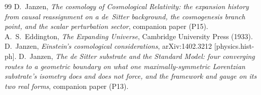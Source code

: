\documentclass[11pt,a4paper]{article}
\begin{document}
\begin{thebibliography}{99}
 D.~Janzen, \emph{The cosmology of Cosmological Relativity: the expansion history from causal reassignment on a de~Sitter background, the cosmogenesis branch point, and the scalar perturbation sector}, companion paper (P15).
 A.~S.~Eddington, \emph{The Expanding Universe}, Cambridge University Press (1933).
 D.~Janzen, \emph{Einstein's cosmological considerations}, arXiv:1402.3212 [physics.hist-ph].
 D.~Janzen, \emph{The de Sitter substrate and the Standard Model: four converging routes to a geometric boundary on what one maximally-symmetric Lorentzian substrate's isometry does and does not force, and the framework and gauge on its two real forms}, companion paper (P13).
\end{thebibliography}


\end{document}
